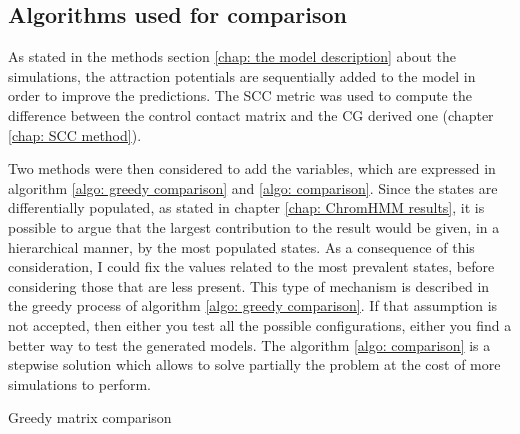 \subsection{Algorithms used for comparison}


As stated in the methods section \ref{chap: the model description} about the simulations, the attraction potentials are sequentially added to the model in order to improve the predictions. The SCC metric was used to compute the difference between the control contact matrix and the CG derived one (chapter \ref{chap: SCC method}).

Two methods were then considered to add the variables, which are expressed in algorithm \ref{algo: greedy comparison} and \ref{algo: comparison}. Since the states are differentially populated, as stated in chapter \ref{chap: ChromHMM results}, it is possible to argue that the largest contribution to the result would be given, in a hierarchical manner, by the most populated states. As a consequence of this consideration, I could fix the values related to the most prevalent states, before considering those that are less present. This type of mechanism is described in the greedy process of algorithm \ref{algo: greedy comparison}. If that assumption is not accepted, then either you test all the possible configurations, either you find a better way to test the generated models. The algorithm \ref{algo: comparison} is a stepwise solution which allows to solve partially the problem at the cost of more simulations to perform. \\

\begin{algorithm}[H]
    \caption{Greedy matrix comparison}\label{algo: greedy comparison}
    \;
\end{algorithm}


